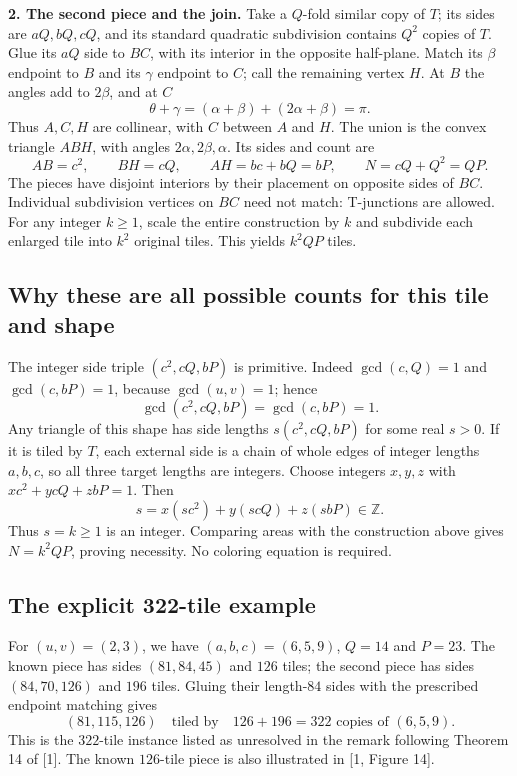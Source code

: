 \documentclass[10pt,a4paper]{article}
\begin{document}
\textbf{2. The second piece and the join.} Take a $Q$-fold similar copy of $T$;
its sides are $aQ,bQ,cQ$, and its standard quadratic subdivision contains $Q^2$
copies of $T$. Glue its $aQ$ side to $BC$, with its interior in the opposite
half-plane. Match its $\beta$ endpoint to $B$ and its $\gamma$ endpoint to $C$;
call the remaining vertex $H$. At $B$ the angles add to $2\beta$, and at $C$
\[
 \theta+\gamma=(\alpha+\beta)+(2\alpha+\beta)=\pi.
\]
Thus $A,C,H$ are collinear, with $C$ between $A$ and $H$. The union is the
convex triangle $ABH$, with angles $2\alpha,2\beta,\alpha$. Its sides and count are
\[
 AB=c^2,\qquad BH=cQ,\qquad AH=bc+bQ=bP,
 \qquad N=cQ+Q^2=QP.
\]
The pieces have disjoint interiors by their placement on opposite sides of $BC$.
Individual subdivision vertices on $BC$ need not match: T-junctions are allowed.
For any integer $k\ge1$, scale the entire construction by $k$ and subdivide
each enlarged tile into $k^2$ original tiles. This yields $k^2QP$ tiles.

\newpage
\subsection*{Why these are all possible counts for this tile and shape}
The integer side triple $(c^2,cQ,bP)$ is primitive. Indeed
$\gcd(c,Q)=1$ and $\gcd(c,bP)=1$, because $\gcd(u,v)=1$; hence
\[
 \gcd(c^2,cQ,bP)=\gcd(c,bP)=1.
\]
Any triangle of this shape has side lengths $s(c^2,cQ,bP)$ for some real
$s>0$. If it is tiled by $T$, each external side is a chain of whole edges
of integer lengths $a,b,c$, so all three target lengths are integers.
Choose integers $x,y,z$ with $xc^2+ycQ+zbP=1$. Then
\[
 s=x(sc^2)+y(scQ)+z(sbP)\in\mathbb Z.
\]
Thus $s=k\ge1$ is an integer. Comparing areas with the construction above
gives $N=k^2QP$, proving necessity. No coloring equation is required.

\subsection*{The explicit 322-tile example}
For $(u,v)=(2,3)$, we have $(a,b,c)=(6,5,9)$, $Q=14$ and $P=23$.
The known piece has sides $(81,84,45)$ and $126$ tiles; the second piece
has sides $(84,70,126)$ and $196$ tiles. Gluing their length-$84$ sides
with the prescribed endpoint matching gives
\[
 \boxed{(81,115,126)\quad\text{tiled by}\quad126+196=322
 \text{ copies of }(6,5,9).}
\]
This is the $322$-tile instance listed as unresolved in the remark following
Theorem 14 of [1]. The known $126$-tile piece is also illustrated in [1, Figure 14].
\end{document}
